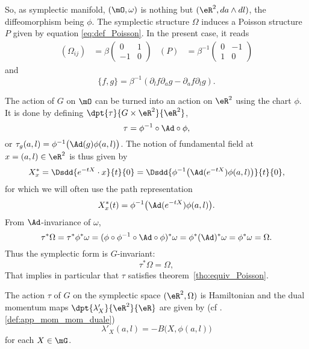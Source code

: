 So, as symplectic manifold, $(\mO,\omega)$ is nothing but $(\eR^2,da\wedge dl)$, the diffeomorphism being $\phi$. The symplectic structure $\Omega$ induces a Poisson structure $P$ given by equation \eqref{eq:def_Poisson}. In the present case, it reads
\begin{align}
	(\Omega_{ij}) & =\beta\begin{pmatrix}
		                      0  & 1 \\
		                      -1 & 0
	                      \end{pmatrix}
	              & (P)                   & =\beta^{-1}\begin{pmatrix}
		                                                   0 & -1 \\
		                                                   1 & 0
	                                                   \end{pmatrix}
\end{align}
and
\begin{equation}\label{eq:Poisson}
	\{f,g\}=\beta^{-1}(\partial_lf\partial_ag-\partial_af\partial_lg).
\end{equation}

The action of $G$ on $\mO$ can be turned into an action on $\eR^2$ using the chart $\phi$. It is done by defining $\dpt{\tau}{G\times\eR^2}{\eR^2}$,
\begin{equation}
	\tau=\phi^{-1}\circ \Ad\circ\phi,
\end{equation}
or $\tau_g(a,l)=\phi^{-1}\big( \Ad(g)\phi(a,l)\big)$.  The notion of fundamental field at $x=(a,l)\in\eR^2$ is thus given by
\begin{equation}
	X^*_x=\Dsdd{e^{-tX}\cdot x}{t}{0}
	=\Dsdd{ \phi^{-1}\big( \Ad(e^{-tX})\phi(a,l)  \big) }{t}{0},
\end{equation}
for which we will often use the path representation
\[
	X^*_x(t)=\phi^{-1}\big( \Ad(e^{-tX})\phi(a,l)  \big).
\]
From $\Ad$-invariance of $\omega$,
\[
	\tau^*\Omega=\tau^*\phi^*\omega
	=(\phi\circ\phi^{-1}\circ \Ad\circ\phi)^*\omega
	=\phi^*(\Ad)^*\omega
	=\phi^*\omega
	=\Omega.
\]
Thus the symplectic form is $G$-invariant:
\begin{equation}     \label{eq:tau_s_Omega}
	\tau^*\Omega=\Omega,
\end{equation}
That implies in particular that $\tau$ satisfies theorem~\ref{tho:equiv_Poisson}.

\begin{proposition}
	The action $\tau$ of $G$ on the symplectic space $(\eR^2,\Omega)$ is Hamiltonian and the dual momentum maps $\dpt{\lambda'_X}{\eR^2}{\eR}$ are given by (cf .\ref{def:app_mom_mom_duale})
	\begin{equation}
		\lambda'_X(a,l)=-B\big(X,\phi(a,l)\big)
	\end{equation}
	for each $X\in\mG$.
	\label{prop:lambda_X}
\end{proposition}


